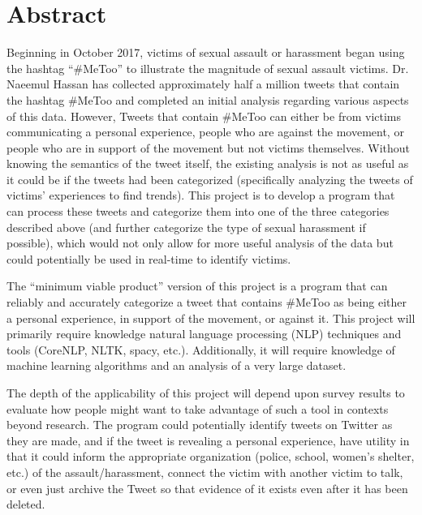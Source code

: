 \section{Abstract}
\label{abstract}

Beginning in October 2017, victims of sexual assault or harassment began using the hashtag “\#MeToo” to illustrate the magnitude of sexual assault victims. Dr. Naeemul Hassan has collected approximately half a million tweets that contain the hashtag \#MeToo and completed an initial analysis regarding various aspects of this data. However, Tweets that contain \#MeToo can either be from victims communicating a personal experience, people who are against the movement, or people who are in support of the movement but not victims themselves. Without knowing the semantics of the tweet itself, the existing analysis is not as useful as it could be if the tweets had been categorized (specifically analyzing the tweets of victims’ experiences to find trends). This project is to develop a program that can process these tweets and categorize them into one of the three categories described above (and further categorize the type of sexual harassment if possible), which would not only allow for more useful analysis of the data but could potentially be used in real-time to identify victims.

The “minimum viable product” version of this project is a program that can reliably and accurately categorize a tweet that contains \#MeToo as being either a personal experience, in support of the movement, or against it. This project will primarily require knowledge natural language processing (NLP) techniques and tools (CoreNLP, NLTK, spacy, etc.). Additionally, it will require knowledge of machine learning algorithms and an analysis of a very large dataset.

The depth of the applicability of this project will depend upon survey results to evaluate how people might want to take advantage of such a tool in contexts beyond research. The program could potentially identify tweets on Twitter as they are made, and if the tweet is revealing a personal experience, have utility in that it could inform the appropriate organization (police, school, women’s shelter, etc.) of the assault/harassment, connect the victim with another victim to talk, or even just archive the Tweet so that evidence of it exists even after it has been deleted.
